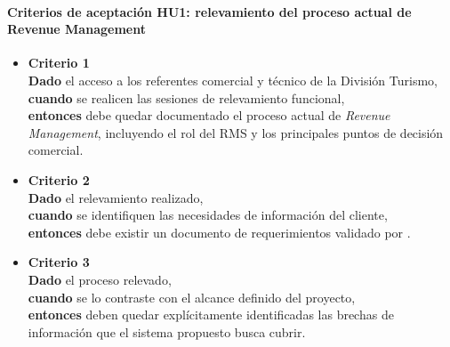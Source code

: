 \documentclass[
11pt, %
]{charter}
\begin{document}
\paragraph{Criterios de aceptación HU1: relevamiento del proceso actual de Revenue Management}
\begin{itemize}
  \item \textbf{Criterio 1} \\
  \textbf{Dado} el acceso a los referentes comercial y técnico de la División Turismo, \\
  \textbf{cuando} se realicen las sesiones de relevamiento funcional, \\
  \textbf{entonces} debe quedar documentado el proceso actual de \textit{Revenue Management}, incluyendo el rol del RMS y los principales puntos de decisión comercial.

  \item \textbf{Criterio 2} \\
  \textbf{Dado} el relevamiento realizado, \\
  \textbf{cuando} se identifiquen las necesidades de información del cliente, \\
  \textbf{entonces} debe existir un documento de requerimientos validado por \clientename.

  \item \textbf{Criterio 3} \\
  \textbf{Dado} el proceso relevado, \\
  \textbf{cuando} se lo contraste con el alcance definido del proyecto, \\
  \textbf{entonces} deben quedar explícitamente identificadas las brechas de información que el sistema propuesto busca cubrir.
\end{itemize}

\vspace{1em}
\end{document}
